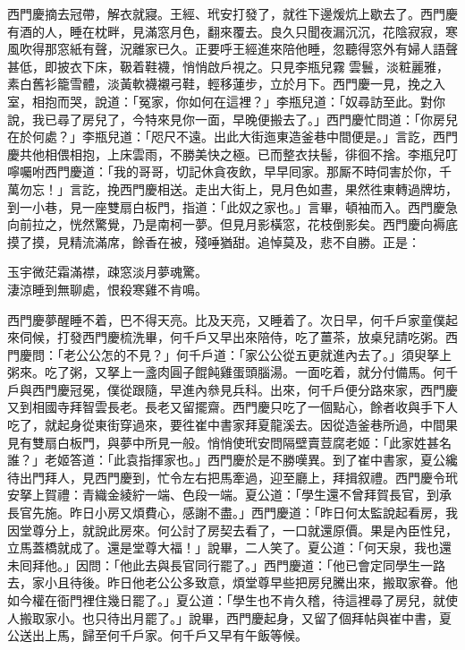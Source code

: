 西門慶摘去冠帶，解衣就寢。王經、玳安打發了，就徃下邊煖炕上歇去了。西門慶有酒的人，睡在枕畔，見滿窓月色，翻來覆去。良久只聞夜漏沉沉，花陰寂寂，寒風吹得那窓紙有聲，況離家已久。正要呼王經進來陪他睡，忽聽得窓外有婦人語聲甚低，即披衣下床，靸着鞋襪，悄悄啟戶視之。只見李瓶兒霧𩬆雲鬟，淡粧麗雅，素白舊衫籠雪體，淡黃軟襪襯弓鞋，輕移蓮步，立於月下。{}西門慶一見，挽之入室，相抱而哭，說道：「冤家，你如何在這裡？」李瓶兒道：「奴尋訪至此。對你說，我已尋了房兒了，今特來見你一面，早晚便搬去了。」西門慶忙問道：「你房兒在於何處？」李瓶兒道：「咫尺不遠。出此大街迤東造釜巷中間便是。」言訖，西門慶共他相偎相抱，上床雲雨，不勝美快之極。已而整衣扶髻，徘徊不捨。李瓶兒叮嚀囑咐西門慶道：「我的哥哥，切記休貪夜飲，早早囘家。那厮不時伺害於你，千萬勿忘！」言訖，挽西門慶相送。走出大街上，見月色如晝，果然徃東轉過牌坊，到一小巷，見一座雙扇白板門，指道：「此奴之家也。」言畢，頓袖而入。西門慶急向前拉之，恍然驚覺，乃是南柯一夢。但見月影橫窓，花枝倒影矣。{}西門慶向褥底摸了摸，見精流滿席，餘香在被，殘唾猶甜。追悼莫及，悲不自勝。正是：

\begin{myquote}
玉宇微茫霜滿襟，疎窓淡月夢魂驚。\\淒涼睡到無聊處，恨殺寒雞不肯鳴。
\end{myquote}

西門慶夢醒睡不着，巴不得天亮。比及天亮，又睡着了。次日早，何千戶家童僕起來伺候，打發西門慶梳洗畢，何千戶又早出來陪侍，吃了薑茶，放桌兒請吃粥。西門慶問：「老公公怎的不見？」何千戶道：「家公公從五更就進內去了。」須臾拏上粥來。吃了粥，又拏上一盞肉圓子餛飩雞蛋頭腦湯。一面吃着，就分付備馬。何千戶與西門慶冠冕，僕從跟隨，早進內叅見兵科。出來，何千戶便分路來家，西門慶又到相國寺拜智雲長老。{}長老又留擺齋。西門慶只吃了一個點心，餘者收與手下人吃了，就起身從東街穿過來，要徃崔中書家拜夏龍溪去。因從造釜巷所過，中間果見有雙扇白板門，與夢中所見一般。悄悄使玳安問隔壁賣荳腐老姬：「此家姓甚名誰？」老姬答道：「此袁指揮家也。」西門慶於是不勝嘆異。到了崔中書家，夏公纔待出門拜人，見西門慶到，忙令左右把馬牽過，迎至廳上，拜揖叙禮。西門慶令玳安拏上賀禮：青織金綾紵一端、色段一端。夏公道：「學生還不曾拜賀長官，到承長官先施。昨日小房又煩費心，感謝不盡。」西門慶道：「昨日何太監說起看房，我因堂尊分上，就說此房來。何公討了房契去看了，一口就還原價。果是內臣性兒，立馬蓋橋就成了。還是堂尊大福！」說畢，二人笑了。夏公道：「何天泉，我也還未囘拜他。」因問：「他此去與長官同行罷了。」西門慶道：「他已會定同學生一路去，家小且待後。昨日他老公公多致意，煩堂尊早些把房兒騰出來，搬取家眷。他如今權在衙門裡住幾日罷了。」夏公道：「學生也不肯久稽，待這裡尋了房兒，就使人搬取家小。也只待出月罷了。」說畢，西門慶起身，又留了個拜帖與崔中書，夏公送出上馬，歸至何千戶家。何千戶又早有午飯等候。

